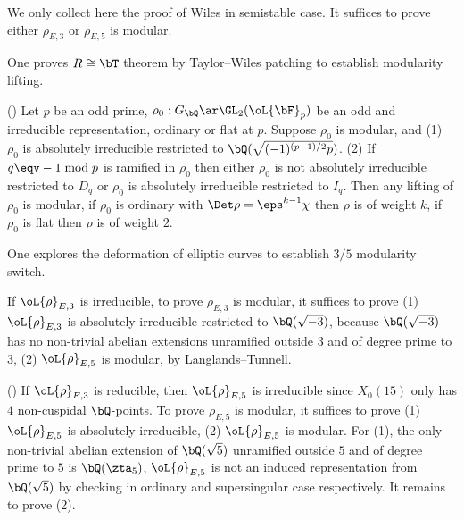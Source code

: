 \documentclass[article, a4paper, twoside]{universal}
\begin{document}
\begin{prf}
	We only collect here the proof of Wiles\cite[Theorem~5.2]{Wiles1995} in semistable case. It suffices to prove either $\rho_{E,3}$ or $\rho_{E,5}$ is modular.

	 One proves $R\cong\bT$ theorem by Taylor--Wiles patching to establish modularity lifting.

	(\cite[Theorem~0.2]{Wiles1995}) Let $p$ be an odd prime, $\rho_{0}:G_{\bQ}\ar\GL_{2}(\oL{\bF}_{p})$ be an odd and irreducible representation, ordinary or flat at $p$. Suppose $\rho_{0}$ is modular, and (1) $\rho_{0}$ is absolutely irreducible restricted to $\bQ(\sqrt{(-1)^{(p-1)/2}p})$. (2) If $q\eqv-1\bmod{p}$ is ramified in $\rho_{0}$ then either $\rho_{0}$ is not absolutely irreducible restricted to $D_{q}$ or $\rho_{0}$ is absolutely irreducible restricted to $I_{q}$. Then any lifting of $\rho_{0}$ is modular, if $\rho_{0}$ is ordinary with $\Det\rho=\eps^{k-1}\chi$ then $\rho$ is of weight $k$, if $\rho_{0}$ is flat then $\rho$ is of weight $2$.


	 One explores the deformation of elliptic curves to establish $3/5$ modularity switch.

	If $\oL{\rho}_{E,3}$ is irreducible, to prove $\rho_{E,3}$ is modular, it suffices to prove (1) $\oL{\rho}_{E,3}$ is absolutely irreducible restricted to $\bQ(\sqrt{-3})$, because $\bQ(\sqrt{-3})$ has no non-trivial abelian extensions unramified outside $3$ and of degree prime to $3$, (2) $\oL{\rho}_{E,5}$ is modular, by Langlands--Tunnell.

	(\cite[Theorem~5.2]{Wiles1995}) If $\oL{\rho}_{E,3}$ is reducible, then $\oL{\rho}_{E,5}$ is irreducible since $X_{0}(15)$ only has $4$ non-cuspidal $\bQ$-points. To prove $\rho_{E,5}$ is modular, it suffices to prove (1) $\oL{\rho}_{E,5}$ is absolutely irreducible, (2) $\oL{\rho}_{E,5}$ is modular. For (1), the only non-trivial abelian extension of $\bQ(\sqrt{5})$ unramified outside $5$ and of degree prime to $5$ is $\bQ(\zta_{5})$, $\oL{\rho}_{E,5}$ is not an induced representation from $\bQ(\sqrt{5})$ by checking in ordinary and supersingular case respectively. It remains to prove (2).


\end{prf}
\end{document}
